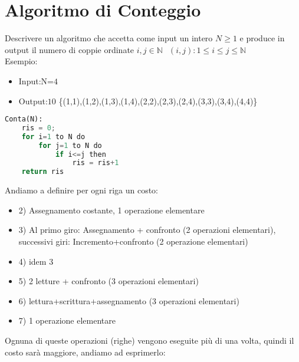 \section{Algoritmo di Conteggio}
Descrivere un algoritmo che accetta come input un intero $N \ge 1 $ e produce in output il numero di coppie
ordinate $i,j \in \mathbb{N} \; \, \; (i,j): 1 \le i \le j \le \mathbb{N} $\\
Esempio:\\
\begin{itemize}
\item Input:N=$4$ 
\item Output:$10$ \{(1,1),(1,2),(1,3),(1,4),(2,2),(2,3),(2,4),(3,3),(3,4),(4,4)\}
\end{itemize}

\begin{lstlisting}[language=Python]
Conta(N):
	ris = 0;
	for i=1 to N do
		for j=1 to N do
			if i<=j then
				ris = ris+1
	return ris
\end{lstlisting}

Andiamo a definire per ogni riga un costo:
\begin{itemize}
\item 2) Assegnamento costante, 1 operazione elementare
\item 3) Al primo giro: Assegnamento + confronto (2 operazioni elementari), successivi giri: Incremento+confronto (2 operazione elementari)
\item 4) idem $3$
\item 5) 2 letture + confronto (3 operazioni elementari)
\item 6) lettura+scrittura+assegnamento (3 operazioni elementari)
\item 7) 1 operazione elementare
\end{itemize}

Ognuna di queste operazioni (righe) vengono eseguite più di una volta, quindi il costo sarà maggiore, andiamo ad esprimerlo:\\

